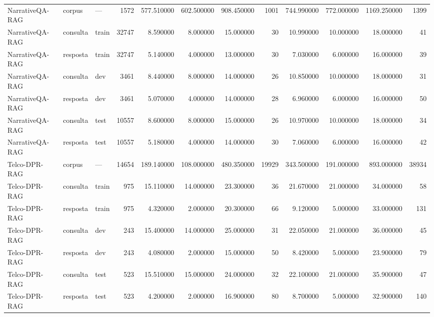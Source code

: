 \begin{table}
\begin{tabular}{lllrrrrrrrrr}
NarrativeQA-RAG & corpus & — & 1572 & 577.510000 & 602.500000 & 908.450000 & 1001 & 744.990000 & 772.000000 & 1169.250000 & 1399 \\
NarrativeQA-RAG & consulta & train & 32747 & 8.590000 & 8.000000 & 15.000000 & 30 & 10.990000 & 10.000000 & 18.000000 & 41 \\
NarrativeQA-RAG & resposta & train & 32747 & 5.140000 & 4.000000 & 13.000000 & 30 & 7.030000 & 6.000000 & 16.000000 & 39 \\
NarrativeQA-RAG & consulta & dev & 3461 & 8.440000 & 8.000000 & 14.000000 & 26 & 10.850000 & 10.000000 & 18.000000 & 31 \\
NarrativeQA-RAG & resposta & dev & 3461 & 5.070000 & 4.000000 & 14.000000 & 28 & 6.960000 & 6.000000 & 16.000000 & 50 \\
NarrativeQA-RAG & consulta & test & 10557 & 8.600000 & 8.000000 & 15.000000 & 26 & 10.970000 & 10.000000 & 18.000000 & 34 \\
NarrativeQA-RAG & resposta & test & 10557 & 5.180000 & 4.000000 & 14.000000 & 30 & 7.060000 & 6.000000 & 16.000000 & 42 \\
Telco-DPR-RAG & corpus & — & 14654 & 189.140000 & 108.000000 & 480.350000 & 19929 & 343.500000 & 191.000000 & 893.000000 & 38934 \\
Telco-DPR-RAG & consulta & train & 975 & 15.110000 & 14.000000 & 23.300000 & 36 & 21.670000 & 21.000000 & 34.000000 & 58 \\
Telco-DPR-RAG & resposta & train & 975 & 4.320000 & 2.000000 & 20.300000 & 66 & 9.120000 & 5.000000 & 33.000000 & 131 \\
Telco-DPR-RAG & consulta & dev & 243 & 15.400000 & 14.000000 & 25.000000 & 31 & 22.050000 & 21.000000 & 36.000000 & 45 \\
Telco-DPR-RAG & resposta & dev & 243 & 4.080000 & 2.000000 & 15.000000 & 50 & 8.420000 & 5.000000 & 23.900000 & 79 \\
Telco-DPR-RAG & consulta & test & 523 & 15.510000 & 15.000000 & 24.000000 & 32 & 22.100000 & 21.000000 & 35.900000 & 47 \\
Telco-DPR-RAG & resposta & test & 523 & 4.200000 & 2.000000 & 16.900000 & 80 & 8.700000 & 5.000000 & 32.900000 & 140 \\
\bottomrule
\end{tabular}
\end{table}
